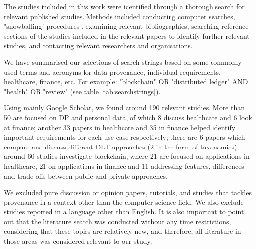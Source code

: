 The studies included in this work were identified through a thorough search for relevant published studies. Methods included conducting computer searches, "snowballing" procedures \cite{snowballing}, examining relevant bibliographies, searching reference sections of the studies included in the relevant papers to identify further relevant studies, and contacting relevant researchers and organisations. 

We have summarised our selections of search strings based on some commonly used terms and acronyms for data provenance, individual requirements, healthcare, finance, etc. For example: "blockchain" OR "distributed ledger" AND "health" OR "review" (see table \ref{tab:searchstrings}).

Using mainly Google Scholar, we found around 190 relevant studies. More than 50 are focused on DP and personal data, of which 8 discuss healthcare and 6 look at finance; another 33 papers in healthcare and 35 in finance helped identify important requirements for each use case respectively; there are 6 papers which compare and discuss different DLT approaches (2 in the form of taxonomies); around 60 studies investigate blockchain, where 21 are focused on applications in healthcare, 21 on applications in finance and 11 addressing features, differences and trade-offs between public and private approaches.

We excluded pure discussion or opinion papers, tutorials, and studies that tackles provenance in a context other than the computer science field. We also exclude studies reported in a language other than English. It is also important to point out that the literature search was conducted without any time restrictions, considering that these topics are relatively new, and therefore, all literature in those areas was considered relevant to our study.



